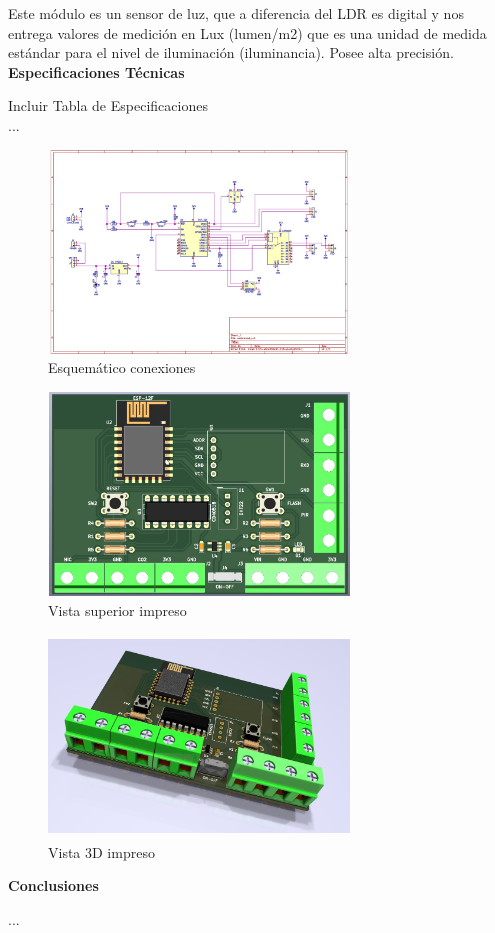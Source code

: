 Este módulo es un sensor de luz, que a diferencia del LDR es digital y nos entrega valores de medición en Lux (lumen/m2) que es una unidad de medida estándar para el nivel de iluminación (iluminancia). Posee alta precisión.\\

\textbf{Especificaciones Técnicas}

Incluir Tabla de Especificaciones\\

...

\begin{figure}[h]
        \centering
        \includegraphics[width=8cm, height=5.4cm]{imagenes/esquematico nodo.jpg}
        \caption{Esquemático conexiones}
        \label{imag:esquematico_nodo}
    \end{figure}

\begin{figure}[h]
        \centering
        \includegraphics[width=8cm, height=5.4cm]{imagenes/vista superior.jpg}
        \caption{Vista superior impreso}
        \label{imag:vista_superior_impreso}
    \end{figure}

\begin{figure}[h]
        \centering
        \includegraphics[width=8cm, height=5.4cm]{imagenes/vista 3D.jpg}
        \caption{Vista 3D impreso}
        \label{imag:vista_3D_impreso}
    \end{figure}

        \textbf{\Large Conclusiones}\newline

        ...

